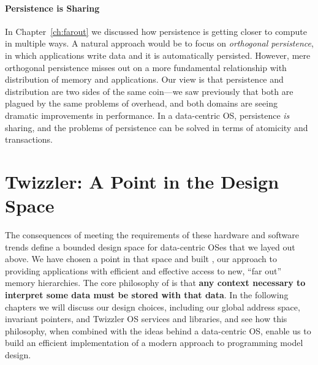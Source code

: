 \paragraph{Persistence is Sharing} In Chapter~\ref{ch:farout} we discussed how persistence is getting closer to compute
in multiple ways. A natural approach would be to focus on \emph{orthogonal persistence}, in which applications write
data and it is automatically persisted. However, mere orthogonal persistence misses out on a more fundamental
relationship with distribution of memory and applications. Our view is that persistence and distribution are
two sides of the same coin---we saw previously that both are plagued by the same problems of overhead, and both domains
are seeing dramatic improvements in performance. In a data-centric OS, persistence \emph{is} sharing, and the
problems of persistence can be solved in terms of atomicity and transactions.

\section{Twizzler: A Point in the Design Space}

The consequences of meeting the requirements of these hardware and software trends
define a bounded design space for data-centric OSes that we layed out above. We have
chosen a point in that space and built \Twizzler, our approach to providing
applications with efficient and effective access to new, ``far out'' memory hierarchies.
The core philosophy of \Twizzler is that \textbf{any context necessary to interpret some data must be stored with that
    data}.
In the
following chapters we will discuss our design choices, including our global address space, invariant pointers, and
Twizzler OS services and libraries, and see how this philosophy, when combined with the ideas behind a data-centric OS,
enable us to build an efficient implementation of a modern approach to programming model design.

